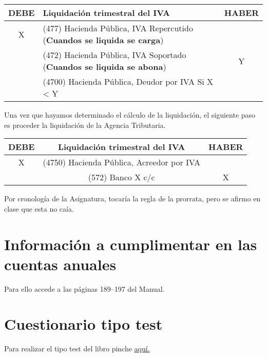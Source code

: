 \documentclass[a4paper,12pt]{article}
\begin{document}
\begin{table}[H]
    \begin{tabular}{|c|l|c|}
    \hline
    \textbf{DEBE} & \textbf{Liquidación trimestral del IVA} & \textbf{HABER} \\ \hline
    X & (477) Hacienda Pública, IVA Repercutido (\textbf{Cuandos se liquida se carga}) &  \\ \hline
     & (472) Hacienda Pública, IVA Soportado (\textbf{Cuandos se liquida se abona})& Y \\ \hline
    & (4700) Hacienda Pública, Deudor por IVA Si X < Y &  \\ \hline
    \end{tabular}
\end{table}
    
    

Una vez que hayamos determinado el cálculo de la liquidación, el siguiente paso es proceder la liquidación de la Agencia Tributaria.

\begin{table}[H]
    \begin{tabular}{|c|c|c|}
    \hline
    \textbf{DEBE} & \textbf{Liquidación trimestral del IVA} & \textbf{HABER} \\ \hline
    X & (4750) Hacienda Pública, Acreedor por IVA & \\ \hline
     &  (572) Banco X c/c & X \\ \hline
    \end{tabular}
\end{table}
    


\begin{tcolorbox}[colback=blue!5!white,colframe=blue!75!black,fonttitle=\bfseries,title=Regla de la prorrata]
    Por cronología de la Asignatura, tocaría la regla de la prorrata, pero se afirmo en clase que esta no caía.
\end{tcolorbox}

\section{Información a cumplimentar en las cuentas anuales}

Para ello accede a las páginas 189--197 del Manual.


\newpage
\section{Cuestionario tipo test}
Para realizar el tipo test del libro pinche \href{https://elblogdeismael.github.io/Asignaturas/Tercer%20A%C3%B1o/CF1/Tests/testT3Libro.html}{aquí.}
\end{document}
